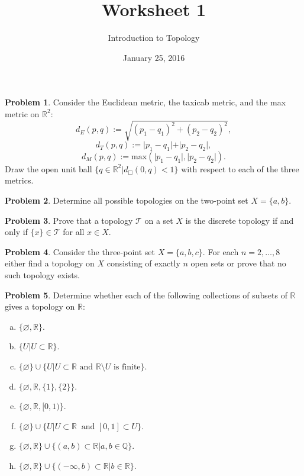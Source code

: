 \documentclass{amsart}
\newcommand{\+}[1]{\ensuremath{\mathbf{#1}}}
\newcommand{\R}{{\mathbb R}}
\renewcommand{\emptyset}{\varnothing}
\theoremstyle{definition}
\newtheorem{prob}{Problem}
\begin{document}
\title{Worksheet 1}
\date{January 25, 2016}
\author{Introduction to Topology}

\maketitle

\begin{prob}
Consider the Euclidean metric, the taxicab metric, and the max metric on $\R^2$:
\[
d_E(p,q) := \sqrt{(p_1 - q_1)^2 + (p_2 - q_2)^2},
\]
\[
d_T(p,q) := \vert{p_1 - q_1}\vert + \vert{p_2 - q_2}\vert,
\]
\[
d_M(p,q) := \text{max}({\vert{p_1 - q_1}\vert, \vert{p_2 - q_2}\vert}).
\]
Draw the open unit ball $\{q \in \R^2 \vert d_\Box(0,q) < 1\}$ with respect to each of the three metrics.
\end{prob}

\begin{prob}
 Determine all possible topologies on the two-point set $X = \{a,b\}$.
\end{prob}

\begin{prob}
 Prove that a topology $\mathcal{T}$ on a set $X$ is the discrete topology if and only if $\{x\} \in \mathcal{T}$ for all $x \in X$.
\end{prob}

\begin{prob}
Consider the three-point set $X = \{a,b,c\}$. 
For each $n = 2,\ldots,8$ either find a topology on $X$
consisting of exactly $n$ open sets or prove that no such topology exists.
\end{prob}


\begin{prob}
Determine whether each of the following collections of subsets of $\R$ gives a topology on $\R$:
 \begin{enumerate}[(a)]
\item $\{\emptyset, \R\}$.
\item $\{U \vert U \subset \R\}$.
\item $\{\emptyset\} \cup \{U \vert U \subset \R \text{ and } \R \setminus U \text{ is finite}\}$.
\item $\{\emptyset, \R, \{1\}, \{2\}\}$.
\item $\{\emptyset, \R, [0,1)\}$.
\item $\{\emptyset\} \cup \{U \vert U \subset \R\ \text{ and } [0,1] \subset U\}$.
\item $\{\emptyset, \R\} \cup \{(a,b) \subset \R \vert a,b \in \mathbb Q \}$.
\item $\{\emptyset, \R\} \cup \{(-\infty,b) \subset \R \vert b \in \R\}$.
 \end{enumerate}
\end{prob}
\end{document}
